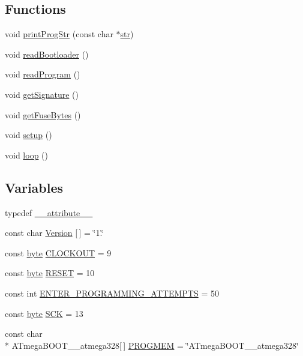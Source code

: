 \subsection*{Functions}
\begin{DoxyCompactItemize}
\item 
void \hyperlink{Atmega__Board__Detector_8ino_af35dbdda9438dd13b4e6a50d96fa27b1}{print\-Prog\-Str} (const char $\ast$\hyperlink{General__Stuff_8h_ad8ab729381f270b100f3d05b6c6676fc}{str})
\item 
void \hyperlink{Atmega__Board__Detector_8ino_a3494f6389f7ea38e13e4e9e07bb997f0}{read\-Bootloader} ()
\item 
void \hyperlink{Atmega__Board__Detector_8ino_acc9003846b9893fd504e16f7dc01d11a}{read\-Program} ()
\item 
void \hyperlink{Atmega__Board__Detector_8ino_aa71c134dd9d74e2e7482f627469048a8}{get\-Signature} ()
\item 
void \hyperlink{Atmega__Board__Detector_8ino_a7431366a2b20f775381b4433ce6841a7}{get\-Fuse\-Bytes} ()
\item 
void \hyperlink{Atmega__Board__Detector_8ino_a4fc01d736fe50cf5b977f755b675f11d}{setup} ()
\item 
void \hyperlink{Atmega__Board__Detector_8ino_afe461d27b9c48d5921c00d521181f12f}{loop} ()
\end{DoxyCompactItemize}
\subsection*{Variables}
\begin{DoxyCompactItemize}
\item 
typedef \hyperlink{Atmega__Board__Detector_8ino_aeab68f17dc686a2f7dc72ab2b712e464}{\-\_\-\-\_\-attribute\-\_\-\-\_\-}
\item 
const char \hyperlink{Atmega__Board__Detector_8ino_a28e0492af3cb02370c5f928d74f60fd1}{Version} \mbox{[}$\,$\mbox{]} = \char`\"{}1.\char`\"{}
\item 
const \hyperlink{Arduino_8h_ab8ef12fab634c171394422d0ee8baf94}{byte} \hyperlink{Atmega__Board__Detector_8ino_ae19697f5162bff99d761fa51490bd7ff}{C\-L\-O\-C\-K\-O\-U\-T} = 9
\item 
const \hyperlink{Arduino_8h_ab8ef12fab634c171394422d0ee8baf94}{byte} \hyperlink{Atmega__Board__Detector_8ino_a802da4bdd8e165d19d8b7dce4ffb0eb2}{R\-E\-S\-E\-T} = 10
\item 
const int \hyperlink{Atmega__Board__Detector_8ino_aaaab39242a7b1fd7494be8c54853b309}{E\-N\-T\-E\-R\-\_\-\-P\-R\-O\-G\-R\-A\-M\-M\-I\-N\-G\-\_\-\-A\-T\-T\-E\-M\-P\-T\-S} = 50
\item 
const \hyperlink{Arduino_8h_ab8ef12fab634c171394422d0ee8baf94}{byte} \hyperlink{Atmega__Board__Detector_8ino_a3badd15d680e205979acf81af5aae7be}{S\-C\-K} = 13
\item 
const char \\*
A\-Tmega\-B\-O\-O\-T\-\_\-\_\-atmega328\mbox{[}$\,$\mbox{]} \hyperlink{Atmega__Board__Detector_8ino_a92c672ee796af9cd4e0c21a4304322a1}{P\-R\-O\-G\-M\-E\-M} = \char`\"{}A\-Tmega\-B\-O\-O\-T\-\_\-\_\-atmega328\char`\"{}
\end{DoxyCompactItemize}


